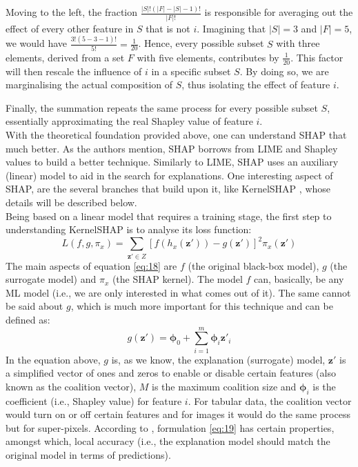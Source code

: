 Moving to the left, the fraction $\frac{|S|!(|F| - |S| - 1)!}{|F|!}$ is responsible for averaging out the effect of every other feature in $S$ that is not $i$. Imagining that $|S| = 3$ and $|F| = 5$, we would have $\frac{3!(5 - 3 - 1)!}{5!} = \frac{1}{20}$. Hence, every possible subset $S$ with three elements, derived from a set $F$ with five elements, contributes by $\frac{1}{20}$. This factor will then rescale the influence of $i$ in a specific subset $S$. By doing so, we are marginalising the actual composition of $S$, thus isolating the effect of feature $i$.

Finally, the summation repeats the same process for every possible subset $S$, essentially approximating the real Shapley value of feature $i$.\\

With the theoretical foundation provided above, one can understand \ac{SHAP} that much better. As the authors mention, \ac{SHAP} borrows from \ac{LIME} and Shapley values to build a better technique. Similarly to \ac{LIME}, \ac{SHAP} uses an auxiliary (linear) model to aid in the search for explanations. One interesting aspect of \ac{SHAP}, are the several branches that build upon it, like Kernel\ac{SHAP} \cite{molnar2019}, whose details will be described below.\\

Being based on a linear model that requires a training stage, the first step to understanding Kernel\ac{SHAP} is to analyse its loss function:
\begin{equation}
    L(f,g,\pi_{x}) = \sum_{\mathbf{z'} \in Z} [f(h_{x}(\mathbf{z'})) - g(\mathbf{z'})]^{2}\pi_{x}(\mathbf{z'})
    \label{eq:18}
\end{equation}
The main aspects of equation \ref{eq:18} are $f$ (the original black-box model), $g$ (the surrogate model) and $\pi_{x}$ (the \ac{SHAP} kernel).
The model $f$ can, basically, be any \ac{ML} model (i.e., we are only interested in what comes out of it). The same cannot be said about $g$, which is much more important for this technique and can be defined as:
\begin{equation}
    g(\mathbf{z}') = \boldsymbol{\phi}_{0} + \sum_{i = 1}^{m} \boldsymbol{\phi}_{i}\mathbf{z}'_{i}
    \label{eq:19}
\end{equation}
In the equation above, $g$ is, as we know, the explanation (surrogate) model, $\mathbf{z}'$ is a simplified vector of ones and zeros to enable or disable certain features (also known as the coalition vector), $M$ is the maximum coalition size and $\boldsymbol{\phi}_i$ is the coefficient (i.e., Shapley value) for feature $i$. For tabular data, the coalition vector would turn on or off certain features and for images it would do the same process but for super-pixels. According to \cite{shap}, formulation \ref{eq:19} has certain properties, amongst which, local accuracy (i.e., the explanation model should match the original model in terms of predictions).\\

